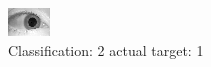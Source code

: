 \begin{figure}[h!]
\begin{center}
\includegraphics[width=0.60\columnwidth]{figures/ID1464_class_2_target_1.png}
\end{center}
\caption{ Classification: 2 actual target: 1}
\label{fig:ID1464_class_2_target_1}
\end{figure}

